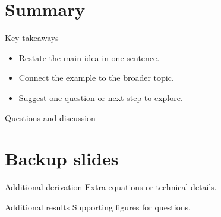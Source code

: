 \documentclass{luma}
\newif\ifshowclosing
\begin{document}
\section{Summary}

\begin{frame}{Key takeaways}
  \begin{itemize}
    \item Restate the main idea in one sentence.
    \item Connect the example to the broader topic.
    \item Suggest one question or next step to explore.
  \end{itemize}
  \bigskip
  {\large\alert{Questions and discussion}}
\end{frame}


\ifshowclosing
\begin{frame}{Questions and discussion}
  \highlight{Replace with the one idea you want the audience to remember.}
  \bigskip

  Contact: \href{mailto:your.name@example.com}{your.name@example.com}\par
  Materials: \url{https://example.com/talk}
\end{frame}
\fi


\appendix
\progressfalse %
\section{Backup slides}

\begin{frame}{Additional derivation}
  Extra equations or technical details.
\end{frame}

\begin{frame}{Additional results}
  Supporting figures for questions.
\end{frame}

\end{document}
